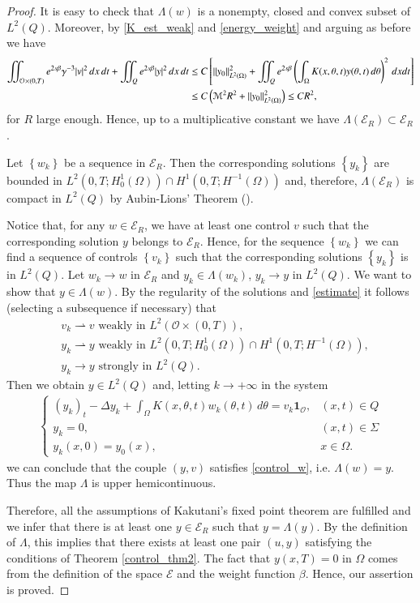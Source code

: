 \documentclass[preprint,1p]{elsarticle}
\newcommand{\D}{\displaystyle}
\newcommand{\norm}[2]{\left\|#1\right\|_{#2}}
\newcommand{\intd}{\displaystyle\int \kern -7pt \int}
\begin{document}
\begin{proof}
It is easy to check that $\Lambda(w)$ is a nonempty, closed and convex subset of $L^2(Q)$. Moreover, by \eqref{K_est_weak} and \eqref{energy_weight} and arguing as before we have
\begin{align}\label{estimate}
	\intd_{\mathcal O\times(0,T)} e^{2s\beta}\gamma^{-3} |v|^2\,dx\,dt + \intd_Q e^{2s\beta}|y|^2\,dx\,dt 
&\leq C \left[\norm{y_0}{L^2(\Omega)}^2 + \intd_Qe^{2s\beta}\left(\int_\Omega K(x,\theta,t)y(\theta,t)\,d\theta\right)^2\,dxdt\right] \notag 
	\\
	&\leq C\left(\mathcal M^2R^2 + \norm{y_0}{L^2(\Omega)}^2\right) \leq CR^2,
\end{align}
for $R$ large enough. Hence, up to a multiplicative constant we have $\Lambda(\mathcal E_R)\subset \mathcal E_R$. 

Let $\left\{w_k\right\}$ be a sequence in $\mathcal E_R$. Then the corresponding solutions $\left\{y_k\right\}$ are bounded in $L^2(0,T;H^1_0(\Omega))\cap H^1(0,T;H^{-1}(\Omega))$ and, therefore, $\Lambda(\mathcal E_R)$ is compact in $L^2(Q)$ by Aubin-Lions' Theorem (\cite{simon1986compact}).

Notice that, for any $w\in \mathcal E_R$, we have at least one control $v$ such that the corresponding solution $y$ belongs to $\mathcal E_R$. Hence, for the sequence $\left\{w_k\right\}$ we can find a sequence of controls $\left\{v_k\right\}$ such that the corresponding solutions $\left\{y_k\right\}$ is in $L^2(Q)$. Let $w_k\to w$ in $\mathcal E_R$ and $y_k\in \Lambda(w_k)$, $y_k\to y$ in $L^2(Q)$. We want to show that $y\in\Lambda(w)$. By the regularity of the solutions and \eqref{estimate} it follows (selecting a subsequence if necessary) that
\begin{align*}
	& v_k\rightharpoonup v \textrm{ weakly in } L^2(\mathcal O\times(0,T)),
	\\
	& y_k\rightharpoonup y \textrm{ weakly in } L^2(0,T;H^1_0(\Omega))\cap H^1(0,T;H^{-1}(\Omega)),
	\\
	& y_k\to y \textrm{ strongly in } L^2(Q). 
\end{align*}
Then we obtain $y\in L^2(Q)$ and, letting $k\to +\infty$ in the system 
\begin{align*}
	\begin{cases}
		\D (y_k)_t - \Delta y_k + \int_\Omega K(x,\theta,t)w_k(\theta,t)\,d\theta = v_k\mathbf{1}_{\mathcal O}, & (x,t)\in Q
		\\
		y_k = 0, & (x,t)\in\Sigma
		\\
		y_k(x,0) = y_0(x), & x\in\Omega.
	\end{cases}
\end{align*} 
we can conclude that the couple $(y,v)$ satisfies \eqref{control_w}, i.e. $\Lambda(w) = y$. Thus the map $\Lambda$ is upper hemicontinuous.

Therefore, all the assumptions of Kakutani's fixed point theorem are fulfilled and we infer that there is at least one $y\in \mathcal E_R$ such that $y=\Lambda(y)$. By the definition of $\Lambda$, this implies that there exists at least one pair $(u,y)$ satisfying the
conditions of Theorem \ref{control_thm2}. The fact that $y(x,T) = 0$ in $\Omega$ comes from the definition of the space $\mathcal E$ and the weight function $\beta$. Hence, our assertion is proved.	
\end{proof}
\end{document}
